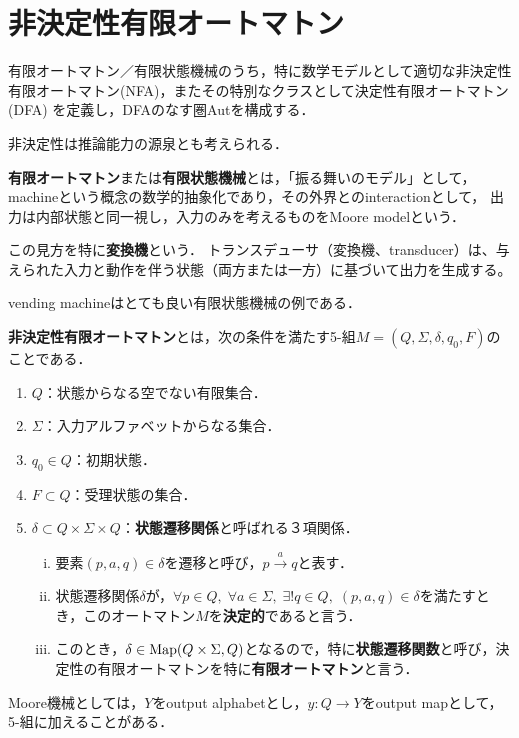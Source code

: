 \documentclass[uplatex, dvipdfmx]{jsreport}
\begin{document}
\section{非決定性有限オートマトン}

\begin{screen}
    有限オートマトン／有限状態機械のうち，特に数学モデルとして適切な非決定性有限オートマトン(NFA)，またその特別なクラスとして決定性有限オートマトン(DFA)
    を定義し，DFAのなす圏Autを構成する．

    非決定性は推論能力の源泉とも考えられる．
\end{screen}

\begin{definition}
    \textbf{有限オートマトン}または\textbf{有限状態機械}とは，「振る舞いのモデル」として，machineという概念の数学的抽象化であり，その外界とのinteractionとして，
    出力は内部状態と同一視し，入力のみを考えるものをMoore modelという．

    この見方を特に\textbf{変換機}という．
    トランスデューサ（変換機、transducer）は、与えられた入力と動作を伴う状態（両方または一方）に基づいて出力を生成する。
\end{definition}
\begin{example}
    vending machineはとても良い有限状態機械の例である．
\end{example}

\begin{definition}
    \textbf{非決定性有限オートマトン}とは，次の条件を満たす5-組$M=(Q,\Sigma,\delta,q_0,F)$のことである．
    \begin{enumerate}
        \item $Q$：状態からなる空でない有限集合．
        \item $\Sigma$：入力アルファベットからなる集合．
        \item $q_0\in Q$：初期状態．
        \item $F\subset Q$：受理状態の集合．
        \item $\delta\subset Q\times\Sigma\times Q$：\textbf{状態遷移関係}と呼ばれる３項関係．
        \begin{enumerate}[(i)]
            \item 要素$(p,a,q)\in\delta$を遷移と呼び，$p\xrightarrow{a}q$と表す．
            \item 状態遷移関係$\delta$が，$\forall p\in Q,\;\forall a\in\Sigma,\;\exists!q\in Q,\;(p,a,q)\in\delta$を満たすとき，このオートマトン$M$を\textbf{決定的}であると言う．
            \item このとき，$\delta\in\mathrm{Map}(Q\times\Sigma,Q)$となるので，特に\textbf{状態遷移関数}と呼び，決定性の有限オートマトンを特に\textbf{有限オートマトン}と言う．
        \end{enumerate}
    \end{enumerate}
\end{definition}
\begin{remark}
    Moore機械としては，$Y$をoutput alphabetとし，$y:Q\to Y$をoutput mapとして，5-組に加えることがある．
\end{remark}
\end{document}
